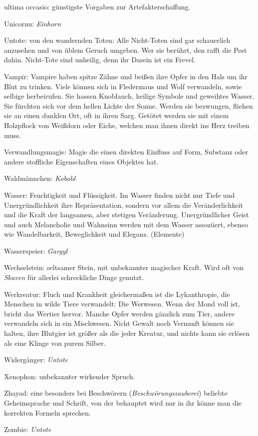 \documentclass[a5paper,8pt]{book}
\begin{document}
\begin{small}
\begin{description}
 \item ultima occasio: günstigste Vorgaben zur Artefakt­erschaffung.
 \item Unicornu: \textit{Einhorn}
 \item Untote: von den wandernden Toten: Alle Nicht-Toten sind gar schauerlich anzusehen und von üblem Geruch umgeben. Wer sie berührt, den rafft die Pest dahin. Nicht-Tote sind unheilig, denn ihr Dasein ist ein Frevel.
 \item Vampir: Vampire haben spitze Zähne und beißen ihre Opfer in den Hals um ihr Blut zu trinken. Viele können sich in Fledermaus und Wolf verwandeln, sowie selbige herbeirufen. Sie hassen Knoblauch, heilige Symbole und geweihtes Wasser. Sie fürchten sich vor dem hellen Lichte der Sonne. Werden sie bezwungen, fliehen sie an einen dunklen Ort, oft in ihren Sarg. Getötet werden sie mit einem Holzpflock von Weißdorn oder Eiche, welchen man ihnen direkt ins Herz treiben muss.
 \item Verwandlungsmagie: Magie die einen direkten Einfluss auf Form, Substanz oder andere stoffliche Eigenschaften eines Objektes hat.
 \item Waldmännchen: \textit{Kobold}
 \item Wasser: Feuchtigkeit und Flüssigkeit. Im Wasser finden nicht nur Tiefe und Unergründlichkeit ihre Re­präsen­tation, sondern vor allem die Veränderlichkeit und die Kraft der langsamen, aber stetigen Veränderung. Unergründlicher Geist und auch Melancholie und Wahn­sinn werden mit dem Wasser assoziiert, ebenso wie Wandelbarkeit, Beweglichkeit und Eleganz. (\textit{}Elemente)
 \item Wasserspeier: \textit{Gargyl}
 \item Wechselstein: seltsamer Stein, mit unbekannter magischer Kraft. Wird oft von \textit{Skaven} für allerlei schreckliche Dinge genutzt.
 \item Werkreatur: Fluch und Krankheit gleichermaßen ist die Lykanthropie, die Menschen in wilde Tiere ver­wandelt: Die Werwesen. Wenn der Mond voll ist, bricht das Wertier hervor. Manche Opfer werden gänzlich zum Tier, andere verwandeln sich in ein Mischwesen. Nicht Gewalt noch Vernunft können sie halten, ihre Blutgier ist größer als die jeder Kreatur, und nichts kann sie erlösen als eine Klinge von purem Silber.
 \item Widergänger: \textit{Untote}
 \item Xenophon: unbekannter wirkender Spruch.
 \item Zhayad: eine besonders bei Beschwörern (\textit{Be­schwörungs­zauberei}) beliebte Geheimsprache und Schrift, von der behauptet wird nur in ihr könne man die 
korrekten Formeln sprechen. 
 \item Zombie: \textit{Untote}

\end{description}

\end{small}
\end{document}

